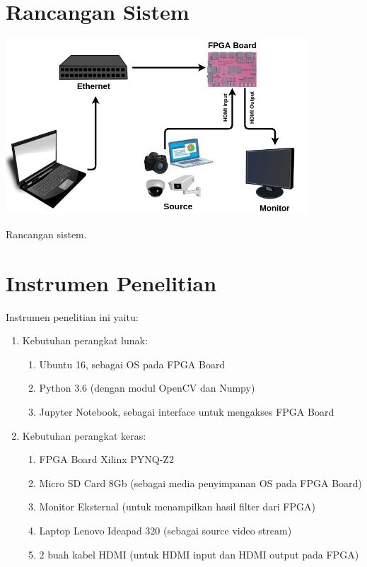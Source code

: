 \section{Rancangan Sistem}
\begin{afigure}
    \includegraphics[width=0.85\textwidth, center]{images/rancangan-sistem.jpg}
    \caption{Rancangan sistem.}
    \label{fig:rancangan-sistem}
\end{afigure}

\section{Instrumen Penelitian}
Instrumen penelitian ini yaitu:
\begin{enumerate}[topsep=0pt,itemsep=0pt,partopsep=0pt, parsep=0pt]
    \item Kebutuhan perangkat lunak:
    \begin{enumerate}[topsep=0pt,itemsep=0pt,partopsep=0pt, parsep=0pt, label=\textbf{\alph*.}]
        \item Ubuntu 16, sebagai OS pada FPGA Board
        \item Python 3.6 (dengan modul OpenCV dan Numpy)
        \item Jupyter Notebook, sebagai interface untuk mengakses FPGA Board 
    \end{enumerate}
    \item Kebutuhan perangkat keras:
    \begin{enumerate}[topsep=0pt,itemsep=0pt,partopsep=0pt, parsep=0pt, label=\textbf{\alph*.}]
        \item FPGA Board Xilinx PYNQ-Z2
        \item Micro SD Card 8Gb (sebagai media penyimpanan OS pada FPGA Board)
        \item Monitor Eksternal (untuk menampilkan hasil filter dari FPGA)
        \item Laptop Lenovo Ideapad 320 (sebagai source video stream)
        \item 2 buah kabel HDMI (untuk HDMI input dan HDMI output pada FPGA) 
    \end{enumerate}
\end{enumerate}
